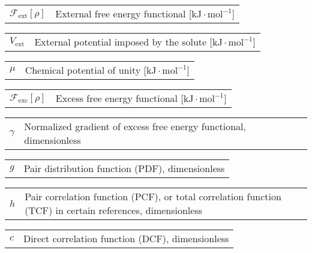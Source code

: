 \hspace{-1.5em}%
\begin{tabular}{>{\raggedright}p{3.3em}l}
$\mathcal{F}_{\mathrm{ext}}[\rho]$ & External free energy functional {[}$\mathrm{kJ\cdot mol^{-1}}${]} \tabularnewline
\end{tabular}

\hspace{-1.5em}%
\begin{tabular}{>{\raggedright}p{3.3em}l}
$V_{\mathrm{ext}}$ & External potential imposed by the solute {[}$\mathrm{kJ\cdot mol^{-1}}${]} \tabularnewline
\end{tabular}

\hspace{-1.5em}%
\begin{tabular}{>{\raggedright}p{3.3em}l}
$\mu$ & Chemical potential of unity {[}$\mathrm{kJ\cdot mol^{-1}}${]}\tabularnewline
\end{tabular}

\hspace{-1.5em}%
\begin{tabular}{>{\raggedright}p{3.3em}l}
$\mathcal{F}_{\mathrm{exc}}[\rho]$ & Excess free energy functional {[}$\mathrm{kJ\cdot mol^{-1}}${]}\tabularnewline
\end{tabular}

\hspace{-1.5em}%
\begin{tabular}{>{\raggedright}p{3.3em}l}
$\gamma$ & Normalized gradient of excess free energy functional, dimensionless\tabularnewline
\end{tabular}

\hspace{-1.5em}%
\begin{tabular}{>{\raggedright}p{3.3em}l}
$g$ & Pair distribution function (PDF), dimensionless\tabularnewline
\end{tabular}

\hspace{-1.5em}%
\begin{tabular}{>{\raggedright}p{3.3em}>{\raggedright}p{}}
$h$ & Pair correlation function (PCF), or total correlation function (TCF)
in certain references, dimensionless\tabularnewline
\end{tabular}

\hspace{-1.5em}%
\begin{tabular}{>{\raggedright}p{3.3em}l}
$c$ & Direct correlation function (DCF), dimensionless\tabularnewline
\end{tabular}

